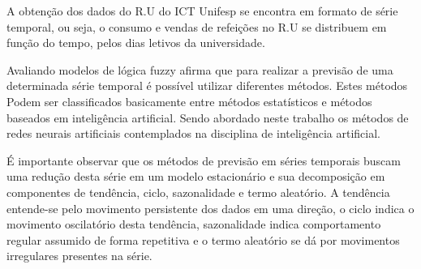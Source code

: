 A obtenção dos dados do R.U do ICT Unifesp se encontra em formato de série temporal, ou seja, o consumo e vendas de refeições no R.U se distribuem em função do tempo, pelos dias letivos da universidade.

Avaliando modelos de lógica fuzzy  afirma que para realizar a previsão de uma determinada série temporal é possível utilizar diferentes métodos. Estes métodos Podem ser classificados basicamente entre métodos estatísticos e métodos baseados em inteligência artificial. Sendo abordado neste trabalho os métodos de redes neurais artificiais contemplados na disciplina de inteligência artificial.
  
É importante observar que os métodos de previsão em séries temporais buscam uma redução desta série em um modelo estacionário e sua decomposição em componentes de tendência, ciclo, sazonalidade e termo aleatório. A tendência entende-se pelo movimento persistente dos dados em uma direção, o ciclo indica o movimento oscilatório desta tendência, sazonalidade indica comportamento regular assumido de forma repetitiva e o termo aleatório se dá por movimentos irregulares presentes na série.


           
